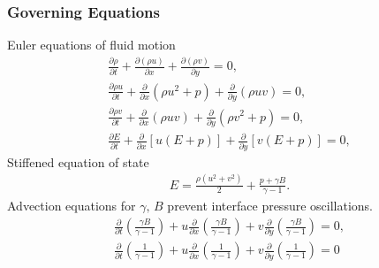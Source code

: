 \begin{frame} \frametitle{\vspace*{0.5cm}Governing Equations}
  \vfil\vspace*{0.5cm}
  {\small
    \hspace*{1cm}Euler equations of fluid motion
  }
  {\scriptsize
    \begin{align*}%
      \frac{\partial \rho}{\partial t} + \frac{\partial \left(\rho u\right)}{\partial x} + \frac{\partial \left(\rho v\right)}{\partial y} = 0,\\
      \frac{\partial \rho u}{\partial t} + \frac{\partial}{\partial x}\left( \rho u^2+p\right)  + \frac{\partial}{\partial y}\left( \rho uv\right) = 0,\\
      \frac{\partial \rho v}{\partial t} + \frac{\partial}{\partial x}\left( \rho uv\right)  + \frac{\partial}{\partial y}\left( \rho v^2+p\right) = 0,\\
      \frac{\partial E}{\partial t} + \frac{\partial}{\partial x}\left[u\left(E+p\right)\right] + \frac{\partial}{\partial y}\left[v\left(E+p\right)\right] = 0,
    \end{align*}%
  }
  \vfil
  {\small
    \hspace*{1cm}Stiffened equation of state
  }
  {\scriptsize
    \begin{align*}%
      E=\frac{\rho\left(u^2+v^2\right)}{2} + \frac{p+\gamma B}{\gamma-1}.
    \end{align*}
  }
  \vfil
  {\small
    \hspace*{1cm}Advection equations for $\gamma,\,B$ prevent interface pressure oscillations.
  }
  \scriptsize{
    \begin{align*}
      \frac{\partial}{\partial t}\left(\frac{\gamma B}{\gamma-1}\right)%
      +u\frac{\partial}{\partial x}\left(\frac{\gamma B}{\gamma-1}\right)%
      +v\frac{\partial}{\partial y}\left(\frac{\gamma B}{\gamma-1}\right)= 0,%
      \\%
      \frac{\partial}{\partial t}\left(\frac{1}{\gamma-1}\right)%
      +u\frac{\partial}{\partial x}\left(\frac{1}{\gamma-1}\right)%
      +v\frac{\partial}{\partial y}\left(\frac{1}{\gamma-1}\right)= 0%
    \end{align*}
  }
\end{frame}
